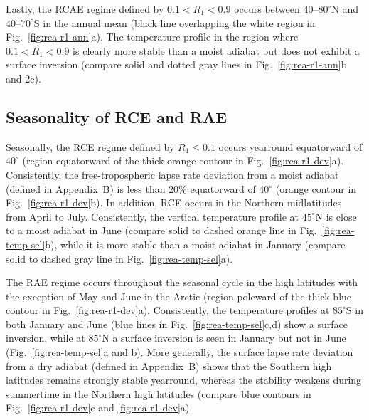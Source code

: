 \documentclass{ametsocV5}
\begin{document}
    Lastly, the RCAE regime defined by $0.1 < R_1 < 0.9$ occurs between $40$--$80^\circ$N and $40$--$70^\circ$S in the annual mean (black line overlapping the white region in Fig.~\ref{fig:rea-r1-ann}a). The temperature profile in the region where $0.1 < R_1 < 0.9$ is clearly more stable than a moist adiabat but does not exhibit a surface inversion (compare solid and dotted gray lines in Fig.~\ref{fig:rea-r1-ann}b and 2c).

    \subsection{Seasonality of RCE and RAE} \label{subsec:seasonality}

    Seasonally, the RCE regime defined by $R_1 \le 0.1$ occurs yearround equatorward of $40^\circ$ (region equatorward of the thick orange contour in Fig.~\ref{fig:rea-r1-dev}a). Consistently, the free-tropospheric lapse rate deviation from a moist adiabat (defined in Appendix~B) is less than 20\% equatorward of 40$^\circ$ (orange contour in Fig.~\ref{fig:rea-r1-dev}b). In addition, RCE occurs in the Northern midlatitudes from April to July. Consistently, the vertical temperature profile at $45^\circ$N is close to a moist adiabat in June (compare solid to dashed orange line in Fig.~\ref{fig:rea-temp-sel}b), while it is more stable than a moist adiabat in January (compare solid to dashed gray line in Fig.~\ref{fig:rea-temp-sel}a). %
    

    The RAE regime occurs throughout the seasonal cycle in the high latitudes with the exception of May and June in the Arctic (region poleward of the thick blue contour in  Fig.~\ref{fig:rea-r1-dev}a). Consistently, the temperature profiles at $85^\circ$S in both January and June (blue lines in Fig.~\ref{fig:rea-temp-sel}c,d) show a surface inversion, while at $85^\circ$N a surface inversion is seen in January but not in June (Fig.~\ref{fig:rea-temp-sel}a and b). More generally, the surface lapse rate deviation from a dry adiabat (defined in Appendix~B) shows that the Southern high latitudes remains strongly stable yearround, whereas the stability weakens during summertime in the Northern high latitudes (compare blue contours in Fig.~\ref{fig:rea-r1-dev}c and \ref{fig:rea-r1-dev}a). %
     
\end{document}
